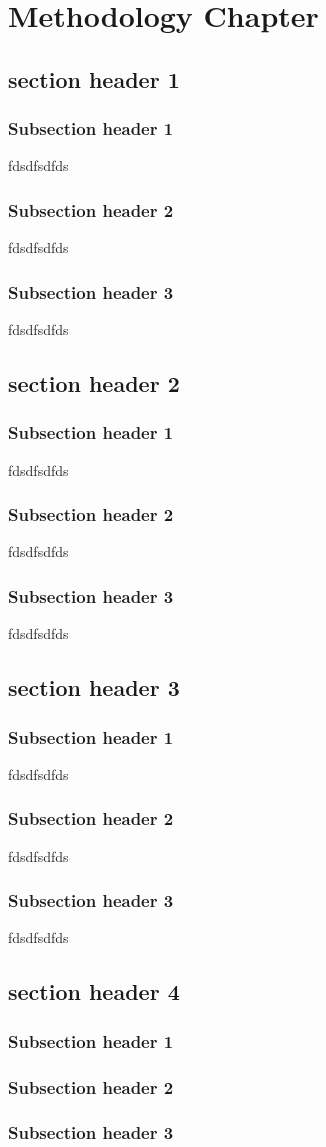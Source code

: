 \chapter{Methodology Chapter}


\section{section header 1}

\subsection{Subsection header 1}
fdsdfsdfds
\subsection{Subsection header 2}
fdsdfsdfds
\subsection{Subsection header 3}
fdsdfsdfds


\section{section header 2}

\subsection{Subsection header 1}
fdsdfsdfds
\subsection{Subsection header 2}
fdsdfsdfds
\subsection{Subsection header 3}
fdsdfsdfds

\section{section header 3}

\subsection{Subsection header 1}
fdsdfsdfds
\subsection{Subsection header 2}
fdsdfsdfds
\subsection{Subsection header 3}
fdsdfsdfds

\section{section header 4}

\subsection{Subsection header 1}
\subsection{Subsection header 2}
\subsection{Subsection header 3}
